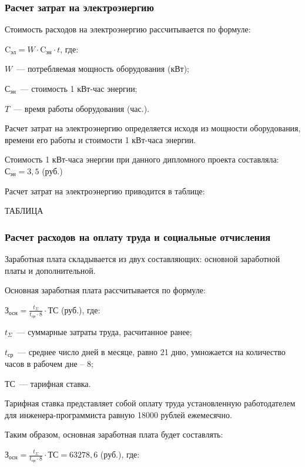 \subsubsection{Расчет затрат на электроэнергию}
Стоимость расходов на электроэнергию рассчитывается по формуле:

\begin{center}
$ \text{C}_\text{эл} = W \cdot \text{C}_\text{эн} \cdot t$, где:
\end{center}

$W$~--- потребляемая мощность оборудования (кВт);

$\text{С}_\text{эн}$~--- стоимость 1 кВт-час энергии;

$T$~--- время работы оборудования (час.).

Расчет затрат на электроэнергию определяется исходя из мощности оборудования, времени его работы и стоимости 1 кВт-часа энергии.

Стоимость 1 кВт-часа энергии при данного дипломного проекта составляла: $ \text{С}_\text{эн} = 3,5$ (руб.)

Расчет затрат на электроэнергию приводится в таблице:

ТАБЛИЦА

\subsubsection{Расчет расходов на оплату труда и социальные отчисления}
Заработная плата складывается из двух составляющих: основной заработной платы и дополнительной.

Основная заработная плата рассчитывается по формуле:

\begin{center}
$ \text{З}_\text{осн} = \frac{t_\Sigma}{t_\text{ср} \cdot 8} \cdot ТС$ (руб.), где:
\end{center}

$t_\Sigma$~--- суммарные затраты труда, расчитанное ранее;

$t_\text{ср}$~--- среднее число дней в месяце, равно 21 дню, умножается на количество часов в рабочем дне  –  8;

$\text{ТС}$~--- тарифная ставка.

Тарифная ставка представляет собой оплату труда установленную работодателем для инженера-программиста равную 18000 рублей ежемесячно.

Таким образом, основная заработная плата будет составлять:

\begin{center}
$ \text{З}_\text{осн} = \frac{t_\Sigma}{t_\text{ср} \cdot 8} \cdot ТС = 63278,6$ (руб.), где:
\end{center}

